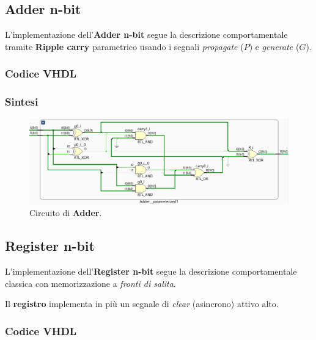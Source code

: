 \documentclass[12pt]{article}
\begin{document}
    \subsection{Adder n-bit}
        L'implementazione dell'\textbf{Adder n-bit} segue la descrizione comportamentale tramite \textbf{Ripple carry} parametrico usando i segnali \textit{propagate} ($P$) e \textit{generate} ($G$).

        \subsubsection{Codice VHDL}
            
            
        \subsubsection{Sintesi}
            \begin{figure}[ht]
                \centering
                \includegraphics[scale=0.5]{Adder.png}
                \caption{Circuito di \textbf{Adder}.}
            \end{figure}

    \subsection{Register n-bit}
        L'implementazione dell'\textbf{Register n-bit} segue la descrizione comportamentale classica con memorizzazione a \textit{fronti di salita}.
        
        Il \textbf{registro} implementa in più un segnale di \textit{clear} (asincrono) attivo alto.

        \subsubsection{Codice VHDL}
           
            
\end{document}
